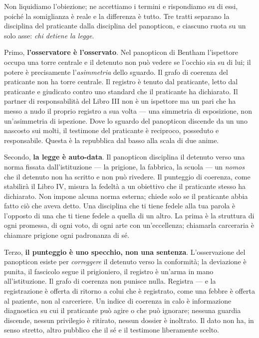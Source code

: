 Non liquidiamo l'obiezione; ne accettiamo i termini e rispondiamo su di essi,
poich\'e la somiglianza \`e reale e la differenza \`e tutto. Tre tratti separano
la disciplina del praticante dalla disciplina del panopticon, e ciascuno ruota
su un solo asse: \emph{chi detiene la legge}.

Primo, \textbf{l'osservatore \`e l'osservato}. Nel panopticon di Bentham
l'ispettore occupa una torre centrale e il detenuto non pu\`o vedere se l'occhio
sia su di lui; il potere \`e precisamente l'\emph{asimmetria} dello sguardo. Il
grafo di coerenza del praticante non ha torre centrale. Il registro \`e tenuto
dal praticante, letto dal praticante e giudicato contro uno standard che il
praticante ha dichiarato. Il partner di responsabilit\`a del Libro III non \`e un
ispettore ma un pari che ha messo a nudo il proprio registro a sua volta --- una
simmetria di esposizione, non un'asimmetria di ispezione. Dove lo sguardo del
panopticon discende da un uno nascosto sui molti, il testimone del praticante \`e
reciproco, posseduto e responsabile. Questa \`e la repubblica dal basso alla
scala di due anime.

Secondo, \textbf{la legge \`e auto-data}. Il panopticon disciplina il detenuto
verso una norma fissata dall'istituzione --- la prigione, la fabbrica, la scuola
--- un \emph{nomos} che il detenuto non ha scritto e non pu\`o rivedere. Il
punteggio di coerenza, come stabilir\`a il Libro IV, misura la fedelt\`a a un
obiettivo che il praticante stesso ha dichiarato. Non impone alcuna norma esterna;
chiede solo se il praticante abbia fatto ci\`o che aveva detto. Una disciplina
che ti tiene fedele alla tua parola \`e l'opposto di una che ti tiene fedele a
quella di un altro. La prima \`e la struttura di ogni promessa, di ogni voto, di
ogni arte con un'eccellenza; chiamarla carceraria \`e chiamare prigione ogni
padronanza di s\'e.

Terzo, \textbf{il punteggio \`e uno specchio, non una sentenza}. L'osservazione
del panopticon esiste per \emph{correggere} il detenuto verso la conformit\`a; la
deviazione \`e punita, il fascicolo segue il prigioniero, il registro \`e
un'arma in mano all'istituzione. Il grafo di coerenza non punisce nulla.
Registra --- e la registrazione \`e offerta di ritorno a colui che \`e
registrato, come una febbre \`e offerta al paziente, non al carceriere. Un indice
di coerenza in calo \`e informazione diagnostica su cui il praticante pu\`o agire
o che pu\`o ignorare; nessuna guardia discende, nessun privilegio \`e ritirato,
nessun dossier \`e inoltrato. Il dato non ha, in senso stretto, altro pubblico
che il s\'e e il testimone liberamente scelto.

